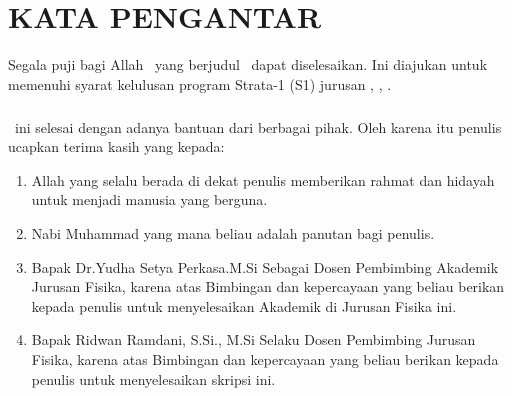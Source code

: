 \chapter*{KATA PENGANTAR} 

Segala puji bagi Allah  \model \ yang berjudul \judul\ dapat diselesaikan. Ini diajukan untuk memenuhi syarat kelulusan program Strata-1 (S1) jurusan \jur, \fak, \kampus. \paragraph{} \model \ ini selesai dengan adanya bantuan dari berbagai pihak. Oleh karena itu penulis ucapkan terima kasih yang kepada: \begin{enumerate} \item Allah  yang selalu berada di dekat penulis memberikan rahmat dan hidayah untuk menjadi manusia yang berguna.
\item Nabi Muhammad  yang mana beliau adalah panutan bagi penulis.
\item Bapak Dr.Yudha Setya Perkasa.M.Si Sebagai Dosen Pembimbing Akademik Jurusan Fisika, karena atas Bimbingan dan kepercayaan yang beliau berikan kepada penulis untuk menyelesaikan Akademik di Jurusan Fisika  ini.
\item Bapak Ridwan Ramdani, S.Si., M.Si Selaku Dosen Pembimbing Jurusan Fisika, karena atas Bimbingan dan kepercayaan yang beliau berikan kepada penulis untuk menyelesaikan skripsi ini.

\end{enumerate}
